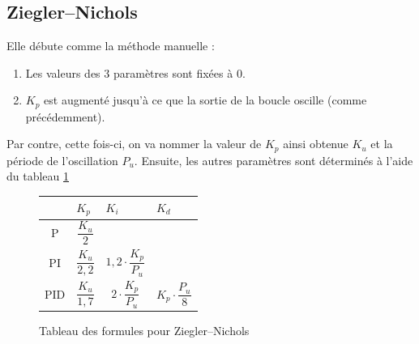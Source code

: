 \documentclass[a4paper,10pt]{report}
\begin{document}
\subsection{Ziegler–Nichols}


Elle débute comme la méthode manuelle :
\begin{enumerate}
    \item Les valeurs des 3 paramètres sont fixées à $0$.
    \item $K_p$ est augmenté jusqu'à ce que la sortie de la boucle oscille (comme précédemment).
\end{enumerate}

Par contre, cette fois-ci, on va nommer la valeur de $K_p$ ainsi obtenue $K_u$ et la période de l'oscillation $P_u$.
Ensuite, les autres paramètres sont déterminés à l'aide du tableau \ref{tab:ZieglerNicholsTuningFormulas}

\def\tabularxcolumn#1{m{#1}}
\begin{figure}[ht]
    \begin{center}
        \begin{tabularx}{\textwidth}{| c | X | X | X |}
            \hline
            & $K_p$ & $K_i$ & $K_d$\\ \hline
            P & \begin{equation*}\frac{K_u}{2}\end{equation*} & &\\ \hline
            PI & \begin{equation*}\frac{K_u}{2,2}\end{equation*} & \begin{equation*}1,2 \cdot \frac{K_p}{P_u}\end{equation*} &\\ \hline
            PID & \begin{equation*}\frac{K_u}{1,7}\end{equation*} & \begin{equation*}2 \cdot \frac{K_p}{P_u}\end{equation*} & \begin{equation*}K_p \cdot \frac{P_u}{8}\end{equation*} \\
            \hline
        \end{tabularx}
    \end{center}
    \caption{Tableau des formules pour Ziegler–Nichols}
    \label{tab:ZieglerNicholsTuningFormulas}
\end{figure}
\end{document}
